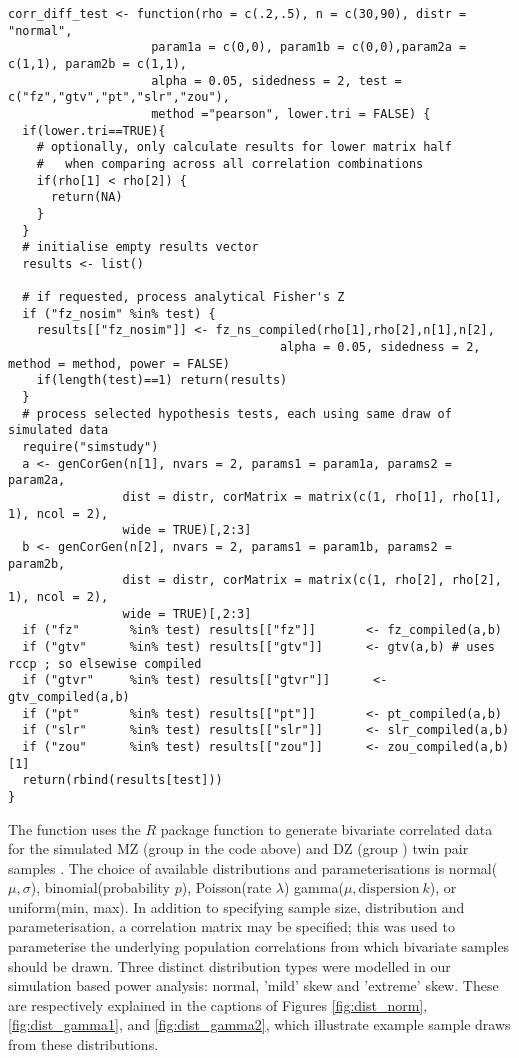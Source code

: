 \begin{lstlisting}[float=h,caption={Single run simulation code},label={lst:corr_diff}]
corr_diff_test <- function(rho = c(.2,.5), n = c(30,90), distr = "normal",
                    param1a = c(0,0), param1b = c(0,0),param2a = c(1,1), param2b = c(1,1),
                    alpha = 0.05, sidedness = 2, test = c("fz","gtv","pt","slr","zou"),
                    method ="pearson", lower.tri = FALSE) {
  if(lower.tri==TRUE){
    # optionally, only calculate results for lower matrix half 
    #   when comparing across all correlation combinations
    if(rho[1] < rho[2]) { 
      return(NA)
    }
  }
  # initialise empty results vector
  results <- list()
  
  # if requested, process analytical Fisher's Z
  if ("fz_nosim" %in% test) {
    results[["fz_nosim"]] <- fz_ns_compiled(rho[1],rho[2],n[1],n[2], 
                                      alpha = 0.05, sidedness = 2, method = method, power = FALSE)
    if(length(test)==1) return(results)
  }
  # process selected hypothesis tests, each using same draw of simulated data
  require("simstudy")
  a <- genCorGen(n[1], nvars = 2, params1 = param1a, params2 = param2a,  
                dist = distr, corMatrix = matrix(c(1, rho[1], rho[1], 1), ncol = 2), 
                wide = TRUE)[,2:3]
  b <- genCorGen(n[2], nvars = 2, params1 = param1b, params2 = param2b,  
                dist = distr, corMatrix = matrix(c(1, rho[2], rho[2], 1), ncol = 2), 
                wide = TRUE)[,2:3]
  if ("fz"       %in% test) results[["fz"]]       <- fz_compiled(a,b)
  if ("gtv"      %in% test) results[["gtv"]]      <- gtv(a,b) # uses rccp ; so elsewise compiled
  if ("gtvr"     %in% test) results[["gtvr"]]      <- gtv_compiled(a,b) 
  if ("pt"       %in% test) results[["pt"]]       <- pt_compiled(a,b)
  if ("slr"      %in% test) results[["slr"]]      <- slr_compiled(a,b)
  if ("zou"      %in% test) results[["zou"]]      <- zou_compiled(a,b)[1]
  return(rbind(results[test]))
}
\end{lstlisting}

The function uses the $R$ package  function  to generate bivariate correlated data for the simulated MZ (group  in the code above) and DZ (group ) twin pair samples \cite{simstudy2018}.  The choice of available distributions and parameterisations is normal($\mu,\sigma$), binomial(probability $p$), Poisson(rate $\lambda$) gamma($\mu,\text{dispersion} \ k$), or uniform(min, max).  In addition to specifying sample size, distribution and parameterisation, a correlation matrix may be specified; this was used to parameterise the underlying population correlations from which bivariate samples should be drawn.  Three distinct distribution types were modelled in our simulation based power analysis: normal, 'mild' skew and 'extreme' skew. These are respectively explained in the captions of Figures \ref{fig:dist_norm}, \ref{fig:dist_gamma1}, and \ref{fig:dist_gamma2}, which illustrate example sample draws from these distributions.  

